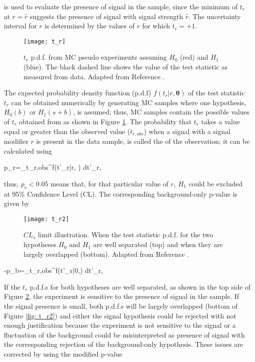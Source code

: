 \noindent is used to evaluate the presence of signal in the sample, since the minimum of $t_r$ at $r=\hat r$ suggests the presence of signal with signal strength $\hat r$. The uncertainty interval for $r$ is determined by the values of $r$ for which $t_r=+1$. 

\begin{figure}[!h]
  \centering
  \texttt{[image: t\_r]}
  \caption[$t_r$ p.d.f. assuming each $H_0$ and $H_1$]{ $t_r$ p.d.f. from MC pseudo experiments assuming $H_0$ (red) and $H_1$ (blue). The black dashed line shows the value of the test statistic as measured from data. Adapted from Reference \cite{luca}.}\label{fig:t_r}
\end{figure}


The expected probability density function (p.d.f) $f({t_r|r,\bm{\theta}})$ of the test statistic $t_r$ can be obtained numerically by generating MC samples where one hypothesis, $H_0(b)$ or $H_1(s+b)$, is assumed; thus, MC samples contain the possible values of $t_r$ obtained from  as shown in Figure \ref{fig:t_r}. The probability that $t_r$ takes a value equal or greater than the observed value ($t_{r,obs}$) when a signal with a signal modifier $r$ is present in the data sample, is called the  of the observation; it can be calculated using 

\beqn
p_r=\int_{t_{r,obs}}^\infty f(t'_r|r, \bm{\theta}) dt'_r,
\eeqn

\noindent thus, $p_r < 0.05$ means that, for that particular value of $r$, $H_1$ could be excluded at 95\% Confidence Level (CL). The corresponding background-only p-value is given by

\begin{figure}[!h]
  \centering
  \texttt{[image: t\_r2]}
  \caption[Illustration of the $CL_s$ limit.]{ $CL_s$ limit illustration. When the test statistic p.d.f. for the two hypotheses $H_0$ and $ H_1$ are well separated (top) and when they are largely overlapped (bottom). Adapted from Reference \cite{luca}.}\label{fig:t_r2}
\end{figure}

-p_b=\int_{t_{r,obs}}^\infty f(t'_r|0,\bm{\theta}) dt'_r,
\eeqn

If the $t_r$ p.d.f.s for both hypotheses are well separated, as shown in the top side of Figure \ref{fig:t_r2}, the experiment is sensitive to the presence of signal in the sample. If the signal presence is small, both p.d.f.s will be largely overlapped (bottom of Figure \ref{fig: t_r2}) and either the signal hypothesis could be rejected with not enough justification because the experiment is not sensitive to the signal or a fluctuation of the background could be misinterpreted as presence of signal with the corresponding rejection of the background-only hypothesis. These issues are corrected by using the modified p-value \cite{read}

